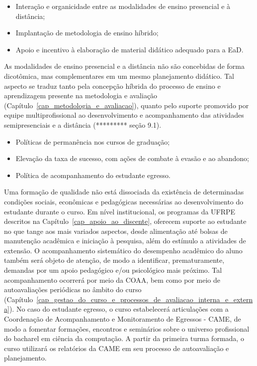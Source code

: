 \documentclass[
	12pt,				%
	openright,			%
  oneside,     %
	a4paper,			%
	chapter=TITLE,		%
	english,			%
	french,				%
	spanish,			%
	brazil				%
	]{abntex2}
\begin{document}
\begin{itemize}
	\item Interação e organicidade entre as modalidades de ensino presencial e à distância;
	\item Implantação de metodologia de ensino híbrido;
	\item Apoio e incentivo à elaboração de material didático adequado para a EaD.
\end{itemize}
 	
As modalidades de ensino presencial e a distância não são concebidas de forma dicotômica, mas complementares em um mesmo planejamento didático. Tal aspecto se traduz tanto pela concepção híbrida do processo de ensino e aprendizagem presente na metodologia e avaliação (Capítulo~\ref{cap_metodologia_e_avaliacao}), quanto pelo suporte promovido por equipe multiprofissional ao desenvolvimento e acompanhamento das atividades semipresenciais e a distância (********* seção 9.1).

\begin{itemize}
	\item Políticas de permanência nos cursos de graduação;	
	\item Elevação da taxa de sucesso, com ações de combate à evasão e ao abandono;
	\item Política de acompanhamento do estudante egresso.
\end{itemize}
 
Uma formação de qualidade não está dissociada da existência de determinadas condições sociais, econômicas e pedagógicas necessárias ao desenvolvimento do estudante durante o curso. Em nível institucional, os programas da UFRPE descritos na Capítulo~\ref{cap_apoio_ao_discente}, oferecem suporte ao estudante no que tange aos mais variados aspectos, desde alimentação até bolsas de manutenção acadêmica e iniciação à pesquisa, além do estímulo a atividades de extensão. O acompanhamento sistemático do desempenho acadêmico do aluno também será objeto de atenção, de modo a identificar, prematuramente, demandas por um apoio pedagógico e/ou psicológico mais próximo. Tal acompanhamento ocorrerá por meio da COAA, bem como por meio de autoavaliações periódicas no âmbito do curso (Capítulo~\ref{cap_gestao_do_curso_e_processos_de_avaliacao_interna_e_externa}). No caso do estudante egresso, o curso estabelecerá articulações com a Coordenação de Acompanhamento e Monitoramento de Egressos - CAME, de modo a fomentar formações, encontros e seminários sobre o universo profissional do bacharel em ciência da computação. A partir da primeira turma formada, o curso utilizará os relatórios da CAME em seu processo de autoavaliação e planejamento.
\end{document}

